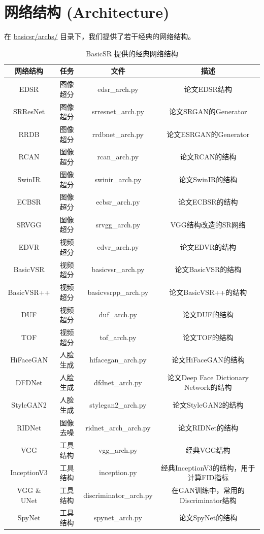 \documentclass[../main.tex]{subfiles}
\begin{document}
	
	\section{网络结构 (Architecture)}
	在 \href{https://github.com/XPixelGroup/BasicSR/tree/master/basicsr/archs}{basicsr/archs/} 目录下，我们提供了若干经典的网络结构。
	
	\begin{table}[h]
		\centering
		{
			\begin{tabular}{|c|c|c|c|}
				\hline
				\textbf{网络结构} & \textbf{任务} & \textbf{文件} & \textbf{描述} \\ \hline
				EDSR & 图像超分 & edsr\_arch.py & 论文EDSR结构 \\ \hline
				SRResNet & 图像超分 & srresnet\_arch.py & 论文SRGAN的Generator \\ \hline
				RRDB & 图像超分 & rrdbnet\_arch.py & 论文ESRGAN的Generator \\ \hline
				RCAN & 图像超分 & rcan\_arch.py & 论文RCAN的结构 \\ \hline
				SwinIR & 图像超分 & swinir\_arch.py & 论文SwinIR的结构 \\ \hline
				ECBSR & 图像超分 & ecbsr\_arch.py & 论文ECBSR的结构 \\ \hline
				SRVGG & 图像超分 & srvgg\_arch.py & VGG结构改造的SR网络 \\ \hline
				EDVR & 视频超分 & edvr\_arch.py & 论文EDVR的结构 \\ \hline
				BasicVSR & 视频超分 & basicvsr\_arch.py &  论文BasicVSR的结构\\ \hline
				BasicVSR++ & 视频超分 & basicvsrpp\_arch.py &  论文BasicVSR++的结构\\ \hline
				DUF & 视频超分 & duf\_arch.py &  论文DUF的结构\\ \hline
				TOF & 视频超分 & tof\_arch.py &  论文TOF的结构\\ \hline
				HiFaceGAN & 人脸生成 & hifacegan\_arch.py &  论文HiFaceGAN的结构\\ \hline
				DFDNet & 人脸生成 & dfdnet\_arch.py &  论文Deep Face Dictionary Network的结构\\ \hline
				StyleGAN2  & 人脸生成 & stylegan2\_arch.py &  论文StyleGAN2的结构 \\ \hline
				RIDNet  & 图像去噪 & ridnet\_arch\_arch.py &  论文RIDNet的结构 \\ \hline
				VGG  & 工具结构 & vgg\_arch.py &  经典VGG结构 \\ \hline
				InceptionV3  & 工具结构 & inception.py &  经典InceptionV3的结构，用于计算FID指标 \\ \hline
				VGG \& UNet  & 工具结构 & discriminator\_arch.py &  在GAN训练中，常用的Discriminator结构 \\ \hline
				SpyNet  & 工具结构 & spynet\_arch.py &  论文SpyNet的结构 \\ \hline
			\end{tabular}
		}
		\caption{BasicSR 提供的经典网络结构}
	\end{table}
	
\end{document}
